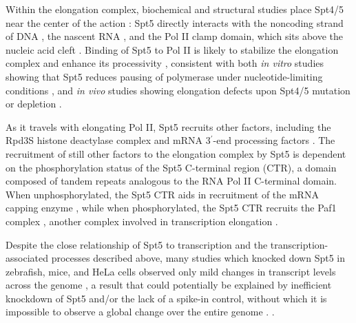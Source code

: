 Within the elongation complex, biochemical and structural studies place Spt4/5 near the center of the action \citep{vos2018a, vos2018b, ehara2017, ehara2019}: Spt5 directly interacts with the noncoding strand of DNA \citep{crickard2016,meyer2015}, the nascent RNA \citep{blythe2016, crickard2016,meyer2015}, and the Pol II clamp domain, which sits above the nucleic acid cleft \citep{hirtreiter2010, martinez-rucobo2011, viktorovskaya2011, yamaguchi1999}.
Binding of Spt5 to Pol II is likely to stabilize the elongation complex and enhance its processivity \citep{hirtreiter2010,klein2011,martinez-rucobo2011,baluapuri2019}, consistent with both \textit{in vitro} studies showing that Spt5 reduces pausing of polymerase under nucleotide-limiting conditions \citep{guo2000,wada1998,zhu2007}, and \textit{in vivo} studies showing elongation defects upon Spt4/5 mutation or depletion \citep{diamant2016,kramer2016,liu2012,mason2005,morillon2003,quan2010,rondon2003}.

As it travels with elongating Pol II, Spt5 recruits other factors, including the Rpd3S histone deactylase complex \citep{drouin2010} and mRNA 3$^\prime$-end processing factors \citep{mayer2012, stadelmayer2014, yamamoto2014}.
The recruitment of still other factors to the elongation complex by Spt5 is dependent on the phosphorylation status of the Spt5 C-terminal region (CTR), a domain composed of tandem repeats analogous to the RNA Pol II C-terminal domain.
When unphosphorylated, the Spt5 CTR aids in recruitment of the mRNA capping enzyme \citep{doamekpor2014, doamekpor2015, schneider2010, wen1999}, while when phosphorylated, the Spt5 CTR recruits the Paf1 complex \citep{liu2009, mbogning2013, wier2013, zhou2009}, another complex involved in transcription elongation \citep{vanoss2017}.

Despite the close relationship of Spt5 to transcription and the transcription-associated processes described above, many studies which knocked down Spt5 in zebrafish, mice, and HeLa cells observed only mild changes in transcript levels across the genome \citep{diamant2016b, komori2009, krishnan2008, stanlie2012, fitz2018}, a result that could potentially be explained by inefficient knockdown of Spt5 and/or the lack of a spike-in control, without which it is impossible to observe a global change over the entire genome \citep{chen2016}. \citep{henriques2018, naguib2019}.

